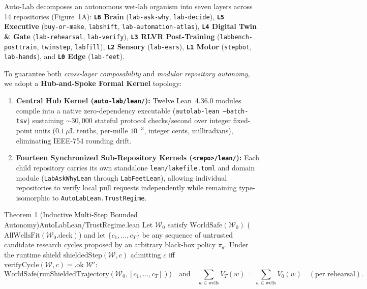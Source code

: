 \documentclass[10pt,letterpaper]{article}
\begin{document}
Auto-Lab decomposes an autonomous wet-lab organism into seven layers across 14 repositories (Figure~1A): \textbf{\texttt{L6} Brain} (\texttt{lab-ask-why}, \texttt{lab-decide}), \textbf{\texttt{L5} Executive} (\texttt{buy-or-make}, \texttt{labshift}, \texttt{lab-automation-atlas}), \textbf{\texttt{L4} Digital Twin \& Gate} (\texttt{lab-rehearsal}, \texttt{lab-verify}), \textbf{\texttt{L3} RLVR Post-Training} (\texttt{labbench-posttrain}, \texttt{twinstep}, \texttt{labfill}), \textbf{\texttt{L2} Sensory} (\texttt{lab-ears}), \textbf{\texttt{L1} Motor} (\texttt{stepbot}, \texttt{lab-hands}), and \textbf{\texttt{L0} Edge} (\texttt{lab-feet}).

To guarantee both \emph{cross-layer composability} and \emph{modular repository autonomy}, we adopt a \textbf{Hub-and-Spoke Formal Kernel} topology:
\begin{enumerate}[leftmargin=1.6em, itemsep=2pt, topsep=2pt]
  \item \textbf{Central Hub Kernel (\texttt{auto-lab/lean/}):} Twelve Lean~4.36.0 modules compile into a native zero-dependency executable (\texttt{autolab-lean --batch-tsv}) sustaining $\sim 30{,}000$ stateful protocol checks/second over integer fixed-point units ($0.1\,\mu\text{L}$ tenths, per-mille $10^{-3}$, integer cents, milliradians), eliminating IEEE-754 rounding drift.
  \item \textbf{Fourteen Synchronized Sub-Repository Kernels (\texttt{<repo>/lean/}):} Each child repository carries its own standalone \texttt{lean/lakefile.toml} and domain module (\texttt{LabAskWhyLean} through \texttt{LabFeetLean}), allowing individual repositories to verify local pull requests independently while remaining type-isomorphic to \texttt{AutoLabLean.TrustRegime}.
\end{enumerate}

\begin{leantheorem}{Theorem 1 (Inductive Multi-Step Bounded Autonomy)}{AutoLabLean/TrustRegime.lean}
Let $\mathcal{W}_0$ satisfy $\mathrm{WorldSafe}(\mathcal{W}_0)$ ($\mathrm{AllWellsFit}(\mathcal{W}_0.\mathrm{deck})$) and let $\{c_1,\dots,c_T\}$ be any sequence of untrusted candidate research cycles proposed by an arbitrary black-box policy $\pi_\theta$. Under the runtime shield $\mathrm{shieldedStep}(\mathcal{W}, c)$ admitting $c$ iff $\mathrm{verifyCycle}(\mathcal{W}, c) = \mathrm{.ok}\;\mathcal{W}'$:
\[
  \mathrm{WorldSafe}\big(\mathrm{runShieldedTrajectory}(\mathcal{W}_0, [c_1,\dots,c_T])\big) \quad \text{and} \quad \sum_{w \in \mathrm{wells}} V_T(w) = \sum_{w \in \mathrm{wells}} V_0(w) \quad (\text{per rehearsal}).
\]
\end{leantheorem}
\end{document}
